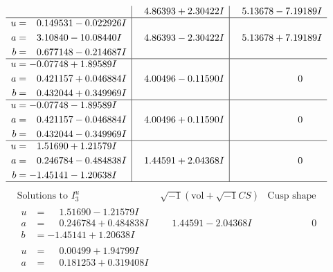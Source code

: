 \documentclass[1p]{elsarticle_modified}
\theoremstyle{definition}
\newcommand{\I}{\sqrt{-1}}
\begin{document}
$$\begin{array}{c|c|c}
 & \phantom{-}4.86393 + 2.30422 I & \phantom{-}5.13678 - 7.19189 I \\ \hline\begin{aligned}
u &= \phantom{-}0.149531 - 0.022926 I \\
a &= \phantom{-}3.10840 - 10.08440 I \\
b &= \phantom{-}0.677148 - 0.214687 I\end{aligned}
 & \phantom{-}4.86393 - 2.30422 I & \phantom{-}5.13678 + 7.19189 I \\ \hline\begin{aligned}
u &= -0.07748 + 1.89589 I \\
a &= \phantom{-}0.421157 + 0.046884 I \\
b &= \phantom{-}0.432044 + 0.349969 I\end{aligned}
 & \phantom{-}4.00496 - 0.11590 I & \phantom{-0.000000 } 0 \\ \hline\begin{aligned}
u &= -0.07748 - 1.89589 I \\
a &= \phantom{-}0.421157 - 0.046884 I \\
b &= \phantom{-}0.432044 - 0.349969 I\end{aligned}
 & \phantom{-}4.00496 + 0.11590 I & \phantom{-0.000000 } 0 \\ \hline\begin{aligned}
u &= \phantom{-}1.51690 + 1.21579 I \\
a &= \phantom{-}0.246784 - 0.484838 I \\
b &= -1.45141 - 1.20638 I\end{aligned}
 & \phantom{-}1.44591 + 2.04368 I & \phantom{-0.000000 } 0\\
 \hline 
 \end{array}$$\newpage$$\begin{array}{c|c|c}  
\text{Solutions to }I^u_{3}& \I (\text{vol} + \sqrt{-1}CS) & \text{Cusp shape}\\
 \hline 
\begin{aligned}
u &= \phantom{-}1.51690 - 1.21579 I \\
a &= \phantom{-}0.246784 + 0.484838 I \\
b &= -1.45141 + 1.20638 I\end{aligned}
 & \phantom{-}1.44591 - 2.04368 I & \phantom{-0.000000 } 0 \\ \hline\begin{aligned}
u &= \phantom{-}0.00499 + 1.94799 I \\
a &= \phantom{-}0.181253 + 0.319408 I \\

\end{aligned}
\end{array}$$
\end{document}
